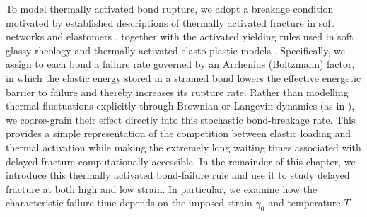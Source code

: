 To model thermally activated bond rupture, we adopt a breakage condition motivated by established descriptions of thermally activated fracture in soft networks and elastomers \cite{Hui2004,Baumberger2009,Creton2016,Wang2023}, together with the activated yielding rules used in soft glassy rheology \cite{sollich_rheological_1998,sollich_thermodynamic_2012} and thermally activated elasto-plastic models \cite{nicolas_deformation_2018,bonn_yield_2017,Rodney2011}. Specifically, we assign to each bond a failure rate governed by an Arrhenius (Boltzmann) factor, in which the elastic energy stored in a strained bond lowers the effective energetic barrier to failure and thereby increases its rupture rate. Rather than modelling thermal fluctuations explicitly through Brownian or Langevin dynamics (as in \cite{tauber_role_2020}), we coarse-grain their effect directly into this stochastic bond-breakage rate. This provides a simple representation of the competition between elastic loading and thermal activation while making the extremely long waiting times associated with delayed fracture computationally accessible. In the remainder of this chapter, we introduce this thermally activated bond-failure rule and use it to study delayed fracture at both high and low strain. In particular, we examine how the characteristic failure time depends on the imposed strain $\gamma_0$ and temperature $T$.



